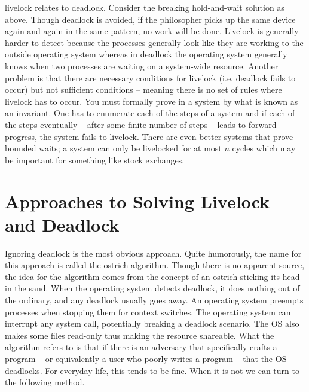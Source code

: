 livelock relates to deadlock.
Consider the breaking hold-and-wait solution as above.
Though deadlock is avoided, if the philosopher picks up the same device again and again in the same pattern, no work will be done.
Livelock is generally harder to detect because the processes generally look like they are working to the outside operating system whereas in deadlock the operating system generally knows when two processes are waiting on a system-wide resource.
Another problem is that there are necessary conditions for livelock (i.e. deadlock fails to occur) but not sufficient conditions -- meaning there is no set of rules where livelock has to occur.
You must formally prove in a system by what is known as an invariant.
One has to enumerate each of the steps of a system and if each of the steps eventually -- after some finite number of steps -- leads to forward progress, the system fails to livelock.
There are even better systems that prove bounded waits; a system can only be livelocked for at most $n$ cycles which may be important for something like stock exchanges.

\section{Approaches to Solving Livelock and Deadlock}

Ignoring deadlock is the most obvious approach.
Quite humorously, the name for this approach is called the ostrich algorithm.
Though there is no apparent source, the idea for the algorithm comes from the concept of an ostrich sticking its head in the sand.
When the operating system detects deadlock, it does nothing out of the ordinary, and any deadlock usually goes away.
An operating system preempts processes when stopping them for context switches.
The operating system can interrupt any system call, potentially breaking a deadlock scenario.
The OS also makes some files read-only thus making the resource shareable.
What the algorithm refers to is that if there is an adversary that specifically crafts a program -- or equivalently a user who poorly writes a program -- that the OS deadlocks.
For everyday life, this tends to be fine.
When it is not we can turn to the following method.

